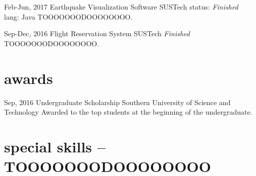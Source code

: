 \documentclass[]{friggeri-cv-a4}
\begin{document}
\begin{entrylist}


\entry
{Feb-Jun, 2017}
{Earthquake Visualization Software}
{SUSTech}
{
    status: \emph{Finished}\\
    lang: Java
TOOOOOOODOOOOOOOO.}


\entry
{Sep-Dec, 2016}
{Flight Reservation System}
{SUSTech}
{\emph{Finished}\\
TOOOOOOODOOOOOOOO.}


\end{entrylist}


\section{awards}

\begin{entrylist}


\entry
{Sep, 2016}
{Undergraduate Scholarship}
{Southern University of Science and Technology}
{Awarded to the top students at the beginning of the undergraduate.}


\end{entrylist}


\section{special skills -- TOOOOOOODOOOOOOOO}
\end{document}
